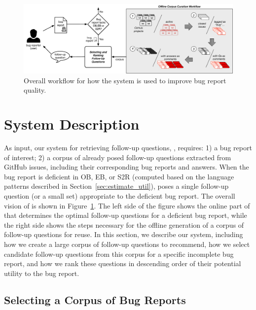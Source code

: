 \begin{figure}[t]
\centering
\includegraphics[width=0.9\linewidth]{figures/pipeline2.pdf}
\caption{Overall workflow for how the \evpi system is used to improve bug report quality.}
\label{fig:pipeline}
\end{figure}

\section{System Description}

As input, our system for retrieving follow-up questions, \evpi, requires: 1) a bug
report of interest; 2) a corpus of already posed follow-up questions extracted
from GitHub issues, including their corresponding bug reports and answers. When the bug report is deficient in OB, EB, or S2R (computed based on the language patterns described in Section~\ref{sec:estimate_util}), \evpi poses a single follow-up question (or a small set) appropriate to the deficient bug report. 
The overall vision of \evpi is shown in Figure~\ref{fig:pipeline}. The left side of the figure shows the online part of \evpi that determines the optimal follow-up questions for a deficient bug report, while the right side shows the steps necessary for the offline generation of a corpus of follow-up questions for reuse. In this section, we describe our system, including how we create a large corpus of follow-up questions to recommend, how we select candidate follow-up questions from
this corpus for a specific incomplete bug report, and how we rank these questions in descending order of
their potential utility to the bug report.

\subsection{Selecting a Corpus of Bug Reports}~\label{sec:select_corpus}


